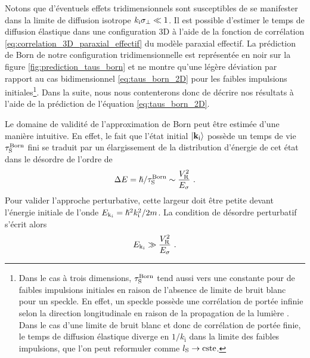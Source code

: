 Notons que d'éventuels effets tridimensionnels sont susceptibles de se manifester dans la limite de diffusion isotrope $k_{\mathrm{i}}\sigma_{\perp} \ll 1$. Il est possible d'estimer le temps de diffusion élastique dans une configuration 3D à l'aide de la fonction de corrélation \ref{eq:correlation_3D_paraxial_effectif} du modèle paraxial effectif. La prédiction de Born de notre configuration tridimensionnelle est représentée en noir sur la figure \ref{fig:prediction_taus_born} et ne montre qu'une légère déviation par rapport au cas bidimensionnel \ref{eq:taus_born_2D} pour les faibles impulsions initiales\footnote{Dans le cas à trois dimensions, $\tau_{\mathrm{S}}^{\mathrm{Born}}$ tend aussi vers une constante pour de faibles impulsions initiales en raison de l'absence de limite de bruit blanc pour un speckle. En effet, un speckle possède une corrélation de portée infinie selon la direction longitudinale en raison de la propagation de la lumière \citep{goodman2007speckle}. Dans le cas d'une limite de bruit blanc et donc de corrélation de portée finie, le temps de diffusion élastique diverge en $1/k_{\mathrm{i}}$ dans la limite des faibles impulsions, que l'on peut reformuler comme $l_{\mathrm{S}}\rightarrow\mathrm{cste}$. }. Dans la suite, nous nous contenterons donc de décrire nos résultats à l'aide de la prédiction de l'équation \ref{eq:taus_born_2D}.


Le domaine de validité de l'approximation de Born peut être estimée d'une manière intuitive. En effet, le fait que l'état initial $\left| \mathbf{k}_{\mathrm{i}} \right\rangle$ possède un temps de vie $\tau_{\mathrm{S}}^{\mathrm{Born}}$ fini se traduit par un élargissement de la distribution d'énergie de cet état dans le désordre de l'ordre de 
\begin{equation}
\Delta E= \hslash/\tau_{\mathrm{S}}^{\mathrm{Born}}\sim \frac{V_{\mathrm{R}}^2}{E_{\sigma}} \text{ .}
\end{equation} 
Pour valider l'approche perturbative, cette largeur doit être petite devant l'énergie initiale de l'onde $E_{\mathrm{k}_i}=\hslash^2 k_{\mathrm{i}}^2 /2m$. La condition de désordre perturbatif s'écrit alors \citep{kuhn2007coherent}
\begin{equation}
E_{\mathrm{k}_i}\gg \frac{V_{\mathrm{R}}^2}{E_{\sigma}} \text{ .}
\end{equation}

